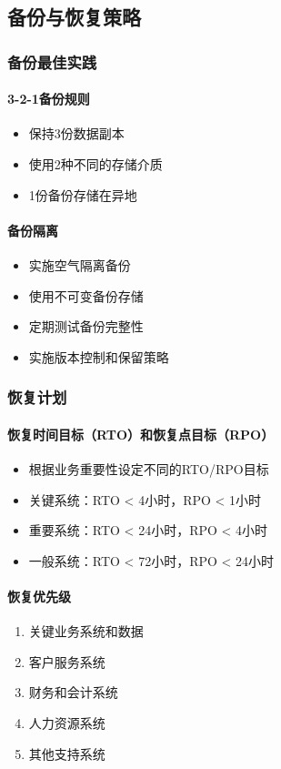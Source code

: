 \documentclass[12pt,a4paper]{article}
\begin{document}
\subsection{备份与恢复策略}

\subsubsection{备份最佳实践}

\paragraph{3-2-1备份规则}
\begin{itemize}
    \item 保持3份数据副本
    \item 使用2种不同的存储介质
    \item 1份备份存储在异地
\end{itemize}

\paragraph{备份隔离}
\begin{itemize}
    \item 实施空气隔离备份
    \item 使用不可变备份存储
    \item 定期测试备份完整性
    \item 实施版本控制和保留策略
\end{itemize}

\subsubsection{恢复计划}

\paragraph{恢复时间目标（RTO）和恢复点目标（RPO）}
\begin{itemize}
    \item 根据业务重要性设定不同的RTO/RPO目标
    \item 关键系统：RTO < 4小时，RPO < 1小时
    \item 重要系统：RTO < 24小时，RPO < 4小时
    \item 一般系统：RTO < 72小时，RPO < 24小时
\end{itemize}

\paragraph{恢复优先级}
\begin{enumerate}
    \item 关键业务系统和数据
    \item 客户服务系统
    \item 财务和会计系统
    \item 人力资源系统
    \item 其他支持系统
\end{enumerate}
\end{document}
